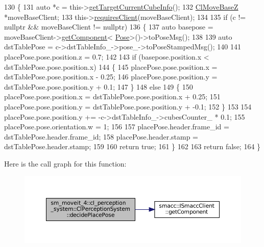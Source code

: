 \begin{DoxyCode}
130             \{
131                 \textcolor{keyword}{auto} *c = this->\hyperlink{classsm__moveit__4_1_1cl__perception__system_1_1ClPerceptionSystem_ac4b944cebb2055a85a33129665df5dcf}{getTargetCurrentCubeInfo}();
132                 \hyperlink{classcl__move__base__z_1_1ClMoveBaseZ}{ClMoveBaseZ} *moveBaseClient;
133                 this->\hyperlink{classsmacc_1_1ISmaccClient_a7a9990a2f3e35d547671188d69fee520}{requiresClient}(moveBaseClient);
134 
135                 \textcolor{keywordflow}{if} (c != \textcolor{keyword}{nullptr} && moveBaseClient != \textcolor{keyword}{nullptr})
136                 \{
137                     \textcolor{keyword}{auto} basepose = moveBaseClient->\hyperlink{classsmacc_1_1ISmaccClient_adef78db601749ca63c19e74a27cb88cc}{getComponent}<
      \hyperlink{classcl__move__base__z_1_1Pose}{Pose}>()->toPoseMsg();
138 
139                     \textcolor{keyword}{auto} dstTablePose = c->dstTableInfo\_->pose\_->toPoseStampedMsg();
140 
141                     placePose.pose.position.z = 0.7;
142 
143                     \textcolor{keywordflow}{if} (basepose.position.x < dstTablePose.pose.position.x)
144                     \{
145                         placePose.pose.position.x = dstTablePose.pose.position.x - 0.25;
146                         placePose.pose.position.y = dstTablePose.pose.position.y + 0.1;
147                     \}
148                     \textcolor{keywordflow}{else}
149                     \{
150                         placePose.pose.position.x = dstTablePose.pose.position.x + 0.25;
151                         placePose.pose.position.y = dstTablePose.pose.position.y + -0.1;
152                     \}
153 
154                     placePose.pose.position.y += -c->dstTableInfo\_->cubesCounter\_ * 0.1;
155                     placePose.pose.orientation.w = 1;
156 
157                     placePose.header.frame\_id = dstTablePose.header.frame\_id;
158                     placePose.header.stamp = dstTablePose.header.stamp;
159 
160                     \textcolor{keywordflow}{return} \textcolor{keyword}{true};
161                 \}
162 
163                 \textcolor{keywordflow}{return} \textcolor{keyword}{false};
164             \}
\end{DoxyCode}
Here is the call graph for this function\+:
\nopagebreak
\begin{figure}[H]
\begin{center}
\leavevmode
\includegraphics[width=350pt]{classsm__moveit__4_1_1cl__perception__system_1_1ClPerceptionSystem_af6ff9a225d451bdee312573296ed02a8_cgraph}
\end{center}
\end{figure}
